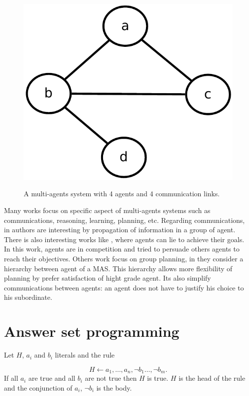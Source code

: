 \documentclass{aamas2012}
\begin{document}
	\begin{figure}
		\centering
		\includegraphics[keepaspectratio=true,scale=0.4]{MAS_graph.pdf}
		\label{MAS_graph}
		\caption{A multi-agents system with 4 agents and 4 communication links.}
	\end{figure}

	Many works focus on specific aspect of multi-agents systems such as communications, reasoning, learning, planning, etc.
	Regarding communications, in \cite{DBLP:conf/ecai/BourgneIM10, DBLP:conf/lads/BourgneIM10} authors are interesting 
	by propagation of information in a group of agent.
	There is also interesting works like \cite{DBLP:conf/ijcai/SakamaSP11}, where agents can lie to achieve their goals.
	In this work, agents are in competition and tried to persuade others agents to reach their objectives.
	Others work focus on group planning, in \cite{DBLP:conf/clima/NieuwenborghVHV06} they consider a hierarchy between agent of a MAS.
	This hierarchy allows more flexibility of planning by prefer satisfaction of hight grade agent.
	Its also simplify communications between agents: an agent does not have to justify his choice to his subordinate.

\section{Answer set programming}

	\begin{definition}[Rule]
		Let $H$, $a_{i}$ and $b_{i}$ literals and the rule
	
					$$H \leftarrow a_{1}, \ldots , a_{n}, \neg b_{1} \ldots, \neg b_{m}.$$
		If all $a_{i}$ are true and all $b_{i}$ are not true then $H$ is true.
		$H$ is the head of the rule and the conjunction of $a_{i}$, $\neg b_{i}$ is the body.
	\end{definition}
\end{document}
